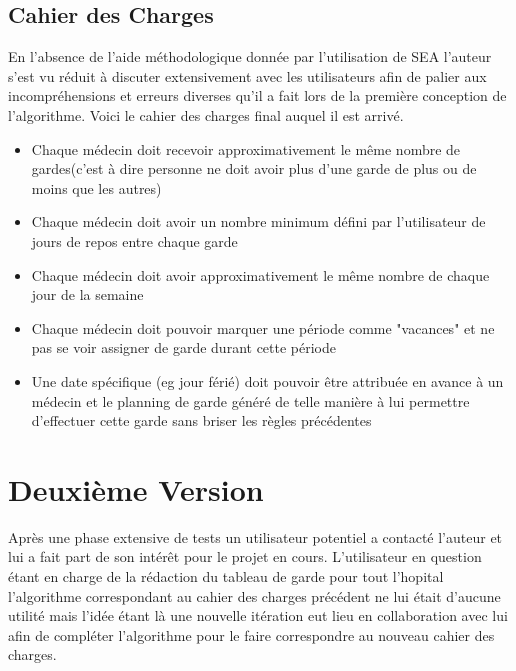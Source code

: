 \documentclass[11pt]{report}
\begin{document}
\subsection{Cahier des Charges}
En l'absence de l'aide méthodologique donnée par l'utilisation de SEA l'auteur s'est vu réduit à discuter extensivement avec les utilisateurs afin de palier aux incompréhensions et erreurs diverses qu'il a fait lors de la première conception de l'algorithme.
Voici le cahier des charges final auquel il est arrivé.
\begin{itemize}
\item Chaque médecin doit recevoir approximativement le même nombre de gardes(c'est à dire personne ne doit avoir plus d'une garde de plus ou de moins que les autres)
\item Chaque médecin doit avoir un nombre minimum défini par l'utilisateur de jours de repos entre chaque garde
\item Chaque médecin doit avoir approximativement le même nombre de chaque jour de la semaine
\item Chaque médecin doit pouvoir marquer une période comme "vacances" et ne pas se voir assigner de garde durant cette période
\item Une date spécifique (eg jour férié) doit pouvoir être attribuée en avance à un médecin et le planning de garde généré de telle manière à lui permettre d'effectuer cette garde sans briser les règles précédentes
\end{itemize}

\section{Deuxième Version}
Après une phase extensive de tests un utilisateur potentiel a contacté l'auteur et lui a fait part de son intérêt pour le projet en cours.
L'utilisateur en question étant en charge de la rédaction du tableau de garde pour tout l'hopital l'algorithme correspondant au cahier des charges précédent ne lui était d'aucune utilité mais l'idée étant là une nouvelle itération eut lieu en collaboration avec lui afin de compléter l'algorithme pour le faire correspondre au nouveau cahier des charges.
\end{document}
